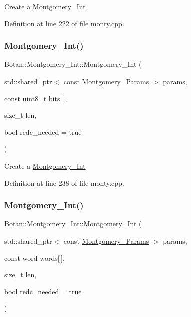 Create a \mbox{\hyperlink{class_botan_1_1_montgomery___int}{Montgomery\+\_\+\+Int}} 

Definition at line 222 of file monty.\+cpp.

\mbox{\label{class_botan_1_1_montgomery___int_a40f15c2012a27cc98c720de74200117d}} 
\subsubsection{\texorpdfstring{Montgomery\+\_\+\+Int()}{Montgomery\_Int()}\hspace{0.1cm}{\footnotesize\ttfamily [3/4]}}
{\footnotesize\ttfamily Botan\+::\+Montgomery\+\_\+\+Int\+::\+Montgomery\+\_\+\+Int (\begin{DoxyParamCaption}\item[{std\+::shared\+\_\+ptr$<$ const \mbox{\hyperlink{class_botan_1_1_montgomery___params}{Montgomery\+\_\+\+Params}} $>$}]{params,  }\item[{const uint8\+\_\+t}]{bits\mbox{[}$\,$\mbox{]},  }\item[{size\+\_\+t}]{len,  }\item[{bool}]{redc\+\_\+needed = {\ttfamily true} }\end{DoxyParamCaption})}

Create a \mbox{\hyperlink{class_botan_1_1_montgomery___int}{Montgomery\+\_\+\+Int}} 

Definition at line 238 of file monty.\+cpp.

\mbox{\label{class_botan_1_1_montgomery___int_a5b3ce373167c2c897ffa6264327eec61}} 
\subsubsection{\texorpdfstring{Montgomery\+\_\+\+Int()}{Montgomery\_Int()}\hspace{0.1cm}{\footnotesize\ttfamily [4/4]}}
{\footnotesize\ttfamily Botan\+::\+Montgomery\+\_\+\+Int\+::\+Montgomery\+\_\+\+Int (\begin{DoxyParamCaption}\item[{std\+::shared\+\_\+ptr$<$ const \mbox{\hyperlink{class_botan_1_1_montgomery___params}{Montgomery\+\_\+\+Params}} $>$}]{params,  }\item[{const word}]{words\mbox{[}$\,$\mbox{]},  }\item[{size\+\_\+t}]{len,  }\item[{bool}]{redc\+\_\+needed = {\ttfamily true} }\end{DoxyParamCaption})}

